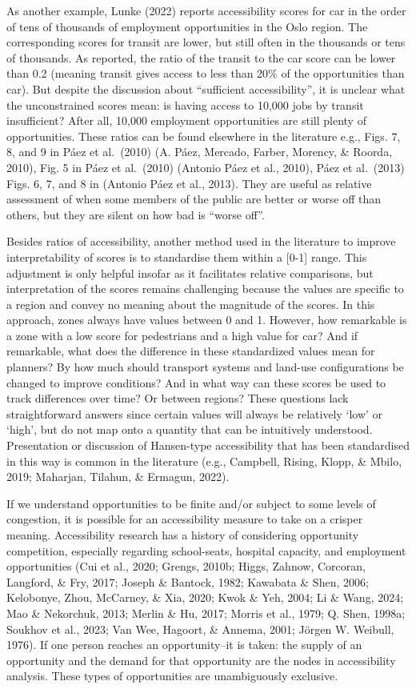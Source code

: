 \documentclass[
11pt, %
oneside, %
english, %
singlespacing, %
]{macthesis} %
\begin{document}
As another example, Lunke (2022) reports accessibility scores for car in the order of tens of thousands of employment opportunities in the Oslo region. The corresponding scores for transit are lower, but still often in the thousands or tens of thousands. As reported, the ratio of the transit to the car score can be lower than 0.2 (meaning transit gives access to less than 20\% of the opportunities than car). But despite the discussion about ``sufficient accessibility'', it is unclear what the unconstrained scores mean: is having access to 10,000 jobs by transit insufficient? After all, 10,000 employment opportunities are still plenty of opportunities. These ratios can be found elsewhere in the literature e.g., Figs. 7, 8, and 9 in Páez et al.~(2010) (A. Páez, Mercado, Farber, Morency, \& Roorda, 2010), Fig. 5 in Páez et al.~(2010) (Antonio Páez et al., 2010), Páez et al.~(2013) Figs. 6, 7, and 8 in (Antonio Páez et al., 2013). They are useful as relative assessment of when some members of the public are better or worse off than others, but they are silent on how bad is ``worse off''.

Besides ratios of accessibility, another method used in the literature to improve interpretability of scores is to standardise them within a {[}0-1{]} range. This adjustment is only helpful insofar as it facilitates relative comparisons, but interpretation of the scores remains challenging because the values are specific to a region and convey no meaning about the magnitude of the scores. In this approach, zones always have values between 0 and 1. However, how remarkable is a zone with a low score for pedestrians and a high value for car? And if remarkable, what does the difference in these standardized values mean for planners? By how much should transport systems and land-use configurations be changed to improve conditions? And in what way can these scores be used to track differences over time? Or between regions? These questions lack straightforward answers since certain values will always be relatively `low' or `high', but do not map onto a quantity that can be intuitively understood. Presentation or discussion of Hansen-type accessibility that has been standardised in this way is common in the literature (e.g., Campbell, Rising, Klopp, \& Mbilo, 2019; Maharjan, Tilahun, \& Ermagun, 2022).

If we understand opportunities to be finite and/or subject to some levels of congestion, it is possible for an accessibility measure to take on a crisper meaning. Accessibility research has a history of considering opportunity competition, especially regarding school-seats, hospital capacity, and employment opportunities (Cui et al., 2020; Grengs, 2010b; Higgs, Zahnow, Corcoran, Langford, \& Fry, 2017; Joseph \& Bantock, 1982; Kawabata \& Shen, 2006; Kelobonye, Zhou, McCarney, \& Xia, 2020; Kwok \& Yeh, 2004; Li \& Wang, 2024; Mao \& Nekorchuk, 2013; Merlin \& Hu, 2017; Morris et al., 1979; Q. Shen, 1998a; Soukhov et al., 2023; Van Wee, Hagoort, \& Annema, 2001; Jörgen W. Weibull, 1976). If one person reaches an opportunity--it is taken: the supply of an opportunity and the demand for that opportunity are the nodes in accessibility analysis. These types of opportunities are unambiguously exclusive.
\end{document}

